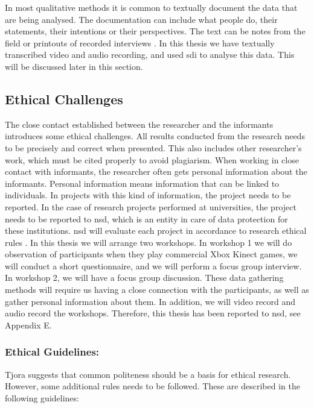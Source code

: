 In most qualitative methods it is common to textually document the data that are being analysed. The documentation can include what people do, their statements, their intentions or their perspectives. The text can be notes from the field or printouts of  recorded interviews \cite{qualitative}. In this thesis we have textually transcribed video and audio recording, and used \ac{sdi} to analyse this data. This will be discussed later in this section.

\subsection{Ethical Challenges}
\label{sec:ethicalchallenges}
The close contact established between the researcher and the informants introduces some ethical challenges. All results conducted from the research needs to be precisely and correct when presented. This also includes other researcher's work, which must be cited properly to avoid plagiarism. When working in close contact with informants, the researcher often gets personal information about the informants. Personal information means information that can be linked to individuals. In projects with this kind of information, the project needs to be reported. In the case of research projects performed at universities, the project needs to be reported to \ac{nsd}, which is an entity in care of data protection for these institutions. \ac{nsd} will evaluate each project in accordance to research ethical rules \cite{qualitative}. In this thesis we will arrange two workshops. In workshop 1 we will do observation of participants when they play commercial Xbox Kinect games, we will conduct a short questionnaire, and we will perform a focus group interview. In workshop 2, we will have a focus group discussion. These data gathering methods will require us having a close connection with the participants, as well as gather personal information about them. In addition, we will video record and audio record the workshops. Therefore, this thesis has been reported to \ac{nsd}, see Appendix E. 

\subsubsection{Ethical Guidelines:}
Tjora \cite{tjora} suggests that common politeness should be a basis for ethical research. However, some additional rules needs to be followed. These are described in the following guidelines:

